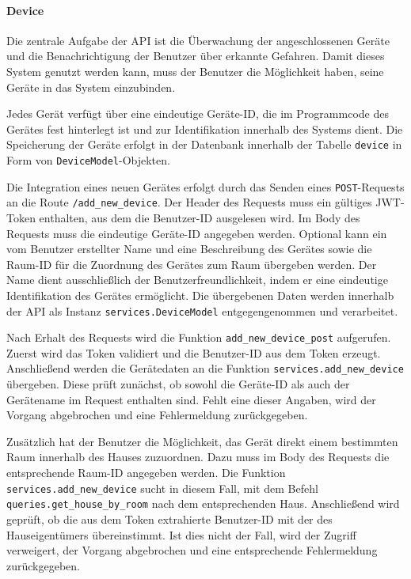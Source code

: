 \documentclass[12pt, letterpaper]{article}
\begin{document}
  \paragraph{Device}
  \par \textbf{}
  \par Die zentrale Aufgabe der API ist die Überwachung der angeschlossenen Geräte und die Benachrichtigung der Benutzer über erkannte Gefahren. Damit dieses System genutzt werden kann, muss der Benutzer die Möglichkeit haben, seine Geräte in das System einzubinden.
  \par Jedes Gerät verfügt über eine eindeutige Geräte-ID, die im Programmcode des Gerätes fest hinterlegt ist und zur Identifikation innerhalb des Systems dient. Die Speicherung der Geräte erfolgt in der Datenbank innerhalb der Tabelle \texttt{device} in Form von \texttt{DeviceModel}-Objekten.
  \par Die Integration eines neuen Gerätes erfolgt durch das Senden eines \texttt{POST}-Requests an die Route \texttt{/add\_new\_device}. Der Header des Requests muss ein gültiges JWT-Token enthalten, aus dem die Benutzer-ID ausgelesen wird. Im Body des Requests muss die eindeutige Geräte-ID angegeben werden.  Optional kann ein vom Benutzer erstellter Name und eine Beschreibung des Gerätes sowie die Raum-ID für die Zuordnung des Gerätes zum Raum übergeben werden. Der Name dient ausschließlich der Benutzerfreundlichkeit, indem er eine eindeutige Identifikation des Gerätes ermöglicht. Die übergebenen Daten werden innerhalb der API als Instanz \texttt{services.DeviceModel} entgegengenommen und verarbeitet.
  \par Nach Erhalt des Requests wird die Funktion \texttt{add\_new\_device\_post} aufgerufen. Zuerst wird das Token validiert und die Benutzer-ID aus dem Token erzeugt. Anschließend werden die Gerätedaten an die Funktion \texttt{services.add\_new\_device} übergeben. Diese prüft zunächst, ob sowohl die Geräte-ID als auch der Gerätename im Request enthalten sind. Fehlt eine dieser Angaben, wird der Vorgang abgebrochen und eine Fehlermeldung zurückgegeben.
  \par Zusätzlich hat der Benutzer die Möglichkeit, das Gerät direkt einem bestimmten Raum innerhalb des Hauses zuzuordnen. Dazu muss im Body des Requests die entsprechende Raum-ID angegeben werden. Die Funktion \texttt{services.add\_new\_device} sucht in diesem Fall, mit dem Befehl \texttt{queries.get\_house\_by\_room} nach dem entsprechenden Haus. Anschließend wird geprüft, ob die aus dem Token extrahierte Benutzer-ID mit der des Hauseigentümers übereinstimmt. Ist dies nicht der Fall, wird der Zugriff verweigert, der Vorgang abgebrochen und eine entsprechende Fehlermeldung zurückgegeben.
\end{document}
